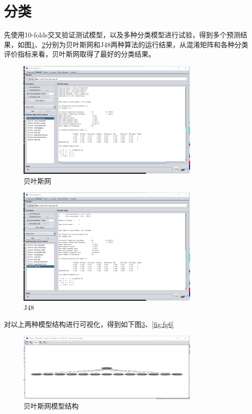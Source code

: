 \documentclass{xcumcmart}
\begin{document}
\section{分类}
先使用10-folds交叉验证测试模型，以及多种分类模型进行试验，得到多个预测结果，如图\ref{fig:fg3}、\ref{fig:fg4}分别为贝叶斯网和J48两种算法的运行结果，从混淆矩阵和各种分类评价指标来看，贝叶斯网取得了最好的分类结果。
\begin{figure}[htbp]
	\centering
	\includegraphics[width=0.8\textwidth]{fig/bayesnet.png}
    \caption{贝叶斯网\label{fig:fg3}}
\end{figure}
\begin{figure}[htbp]
	\centering
	\includegraphics[width=0.8\textwidth]{fig/j48.png}
    \caption{J48\label{fig:fg4}}
\end{figure}
对以上两种模型结构进行可视化，得到如下图\ref{fig:fg5}、\ref{fig:fg6}
\begin{figure}[htbp]
	\centering
	\includegraphics[width=0.8\textwidth]{fig/modelbayes.png}
    \caption{贝叶斯网模型结构\label{fig:fg5}}
\end{figure}
\end{document}
